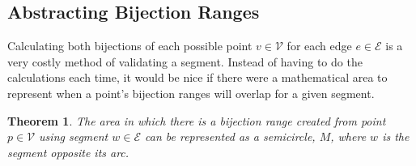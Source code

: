 \documentclass[12pt]{article}
\newtheorem{theorem}{Theorem}[section]
\begin{document}
\subsection*{Abstracting Bijection Ranges}\label{subsec*:bijection-range-method}
Calculating both bijections of each possible point $v \in \mathcal{V}$
for each edge $e \in \mathcal{E}$
is a very costly method of validating a segment. Instead of having to do the calculations
each time, it would be nice if there were a mathematical area to represent
when a point's bijection ranges will overlap for a given segment.
\begin{theorem}\label{thm:semicircle}
The area in which there is a bijection range created from point $p \in \mathcal{V}$
using segment $w \in \mathcal{E}$
can be represented as a semicircle, $M$, where $w$ is the segment opposite its arc.
\end{theorem}
\end{document}
